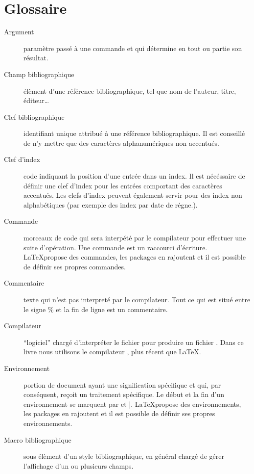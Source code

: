 \chapter{Glossaire}


\begin{description}
\item[Argument] paramètre passé à une commande et qui détermine en tout ou partie son résultat.


\item[Champ bibliographique]élèment d'une référence bibliographique, tel que nom de l'auteur, titre, éditeur…

\item[Clef bibliographique]identifiant unique attribué à une référence bibliographique. Il est conseillé de n'y mettre que des caractères alphanumériques non accentués.

\item[Clef d'index] code indiquant la position d'une entrée dans un index. Il est nécéssaire de définir une clef d'index pour les entrées comportant des caractères accentués. Les clefs d'index peuvent également servir pour des index non alphabétiques (par exemple des index par date de régne.).

\item[Commande] morceaux de code qui sera interpété par le compilateur pour effectuer une suite d'opération. Une commande est un raccourci d'écriture. \LaTeX propose des commandes, les packages en rajoutent et il est possible de définir ses propres commandes.

\item[Commentaire] texte qui n'est pas interpreté par le compilateur. Tout ce qui est situé entre le signe \% et la fin de ligne est un commentaire.

\item[Compilateur]\enquote{logiciel} chargé d'interpréter le fichier  pour produire un fichier . Dans ce livre nous utilisons le compilateur \XeLaTeX, plus récent que \LaTeX.

\item[Environnement]portion de document ayant une signification spécifique et qui, par conséquent, reçoit un traitement spécifique. Le début et la fin d'un environnement se marquent par  et |. \LaTeX propose des environnements, les packages en rajoutent et il est possible de définir ses propres environnements.

\item[Macro bibliographique]sous élèment d'un style bibliographique, en général chargé de gérer l'affichage d'un ou plusieurs champs.


\end{description}
